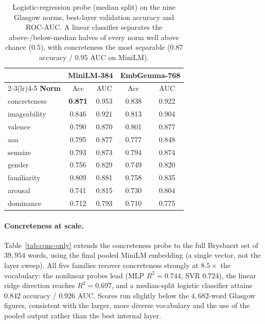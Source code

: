 \begin{table}[t]
  \centering
  \small
  \begin{tabular}{@{}lcccc@{}}
    \toprule
    & \multicolumn{2}{c}{\textbf{MiniLM-384}} & \multicolumn{2}{c}{\textbf{EmbGemma-768}} \\
    \cmidrule(lr){2-3}\cmidrule(lr){4-5}
    \textbf{Norm} & Acc & AUC & Acc & AUC \\
    \midrule
    concreteness & \textbf{0.871} & 0.953 & 0.838 & 0.922 \\
    imageability & 0.846 & 0.921 & 0.813 & 0.904 \\
    valence      & 0.790 & 0.870 & 0.801 & 0.877 \\
    aoa          & 0.795 & 0.877 & 0.777 & 0.848 \\
    semsize      & 0.793 & 0.873 & 0.794 & 0.874 \\
    gender       & 0.756 & 0.829 & 0.749 & 0.820 \\
    familiarity  & 0.809 & 0.881 & 0.758 & 0.835 \\
    arousal      & 0.741 & 0.815 & 0.730 & 0.804 \\
    dominance    & 0.712 & 0.793 & 0.710 & 0.775 \\
    \bottomrule
  \end{tabular}
  \caption{Logistic-regression probe (median split) on the nine Glasgow norms,
  best-layer validation accuracy and ROC-AUC. A linear classifier separates the
  above-/below-median halves of every norm well above chance ($0.5$), with
  concreteness the most separable ($0.87$ accuracy / $0.95$ AUC on MiniLM).}
  \label{tab:glasgow-logreg}
\end{table}

\paragraph{Concreteness at scale.}
Table~\ref{tab:conc-only} extends the concreteness probe to the full Brysbaert
set of $39{,}954$ words, using the final pooled MiniLM embedding (a single
vector, not the layer sweep). All five families recover concreteness strongly at
$8.5\times$ the vocabulary: the nonlinear probes lead (MLP $R^2=0.744$, SVR
$0.724$), the linear ridge direction reaches $R^2=0.697$, and a median-split
logistic classifier attains $0.842$ accuracy / $0.926$ AUC. Scores run slightly
below the $4{,}682$-word Glasgow figures, consistent with the larger, more
diverse vocabulary and the use of the pooled output rather than the best
internal layer.

